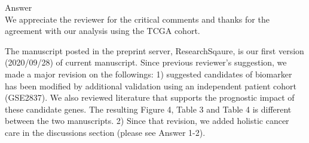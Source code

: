 \documentclass[preprint,12pt]{elsarticle}
\newenvironment{MyColorPar}[1]{%
    \leavevmode\color{#1}\ignorespaces%
}{%
}%
\begin{document}



\begin{MyColorPar}{blue}
Answer\\
We appreciate the reviewer for the critical comments and thanks for the agreement with our analysis using the TCGA cohort.

The manuscript posted in the preprint server, ResearchSqaure, is our first version (2020/09/28) of current manuscript. 
Since previous reviewer's suggestion, we made a major revision on the followings:
1) suggested candidates of biomarker has been modified  by additional validation using an independent patient cohort (GSE2837).
We also reviewed literature that supports the prognostic impact of these candidate genes. The resulting Figure 4, Table 3 and Table 4 is different between the two manuscripts.
2) Since that revision, we added holistic cancer care in the discussions section (please see Answer 1-2).%





\end{MyColorPar}

\end{document}

